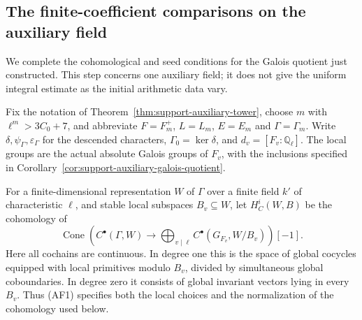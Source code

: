 \subsection{The finite-coefficient comparisons on the auxiliary field}
\label{sec:support-auxiliary-frame}

We complete the cohomological and seed conditions for the Galois
quotient just constructed.  This step concerns one auxiliary field;
it does not give the uniform integral estimate as the initial
arithmetic data vary.

Fix the notation of Theorem~\ref{thm:support-auxiliary-tower},
choose $m$ with $\ell^m>3C_0+7$, and abbreviate
$F=F_m^+$, $L=L_m$, $E=E_m$ and $\Gamma=\Gamma_m$.
Write $\delta,\psi_\Gamma,\varepsilon_\Gamma$ for the descended
characters, $\Gamma_0=\ker\delta$, and
$d_v=[F_v:\mathbb Q_\ell]$.  The local groups are the actual
absolute Galois groups of $F_v$, with the inclusions specified
in Corollary~\ref{cor:support-auxiliary-galois-quotient}.

For a finite-dimensional representation $W$ of $\Gamma$ over a
finite field $k'$ of characteristic $\ell$, and stable local
subspaces $B_v\subseteq W$, let $H^i_C(W,B)$ be the cohomology
of
\[
 \operatorname{Cone}\left(C^\bullet(\Gamma,W)
      \longrightarrow\bigoplus_{v\mid\ell}
              C^\bullet(G_{F_v},W/B_v)\right)[-1].       \tag{AF1}
\]
Here all cochains are continuous.  In degree one this is the
space of global cocycles equipped with local primitives modulo
$B_v$, divided by simultaneous global coboundaries.  In degree
zero it consists of global invariant vectors lying in every
$B_v$.  Thus (AF1) specifies both the local choices and the
normalization of the cohomology used below.

